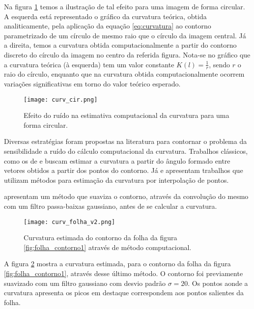 Na figura \ref{fig:cir1} temos a ilustração de tal efeito para uma imagem de forma circular. A esquerda está representado o gráfico da curvatura teórica, obtida analiticamente, pela aplicação da equação \ref{eq:curvatura} ao contorno parametrizado de um círculo de mesmo raio que o círculo da imagem central. Já a direita, temos a curvatura obtida computacionalmente a partir do contorno discreto do círculo da imagem no centro da referida figura. Nota-se no gráfico que a curvatura teórica (à esquerda) tem um valor constante $K(l) = \frac{1}{r}$, sendo $r$ o raio do círculo, enquanto que na curvatura obtida computacionalmente ocorrem variações significativas em torno do valor teórico esperado.

\begin{figure}[h!]
  \caption{\label{fig:cir1} Efeito do ruído na estimativa computacional da curvatura para uma forma circular.}
  \centering
  \texttt{[image: curv\_cir.png]}
\end{figure}

Diversas estratégias foram propostas na literatura para contornar o problema da sensibilidade a ruído do cálculo computacional da curvatura. Trabalhos clássicos, como os de  e  buscam estimar a curvatura a partir do ângulo formado entre vetores obtidos a partir dos pontos do contorno. Já  e  apresentam trabalhos que utilizam métodos para estimação da curvatura por interpolação de pontos. 

 apresentam um método que suaviza o contorno, através da convolução do mesmo com um filtro passa-baixas gaussiano, antes de se calcular a curvatura.

\begin{figure}[h!]
 \caption{\label{fig:curv_folha} Curvatura estimada do contorno da folha da figura \ref{fig:folha_contorno1} através de método computacional.}
  \centering
  \texttt{[image: curv\_folha\_v2.png]}
\end{figure}

A figura \ref{fig:curv_folha} mostra a curvatura estimada, para o contorno da folha da figura \ref{fig:folha_contorno1}, através desse último método. O contorno foi previamente suavizado com um filtro gaussiano com desvio padrão $\sigma = 20$. Os pontos aonde a curvatura apresenta os picos em destaque correspondem aos pontos salientes da folha. 


